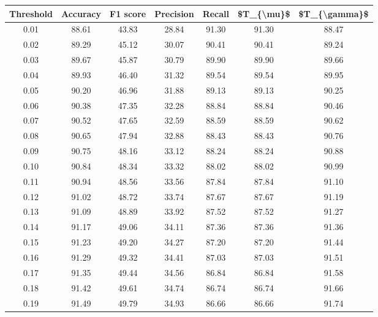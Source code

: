 \begin{tabular}{|c|c|c|c|c|c|c|}
\hline
 Threshold &  Accuracy &  F1 score &  Precision &  Recall &  \$T\_\{\textbackslash mu\}\$ &  \$T\_\{\textbackslash gamma\}\$ \\
\hline
      0.01 &     88.61 &     43.83 &      28.84 &   91.30 &      91.30 &         88.47 \\
      0.02 &     89.29 &     45.12 &      30.07 &   90.41 &      90.41 &         89.24 \\
      0.03 &     89.67 &     45.87 &      30.79 &   89.90 &      89.90 &         89.66 \\
      0.04 &     89.93 &     46.40 &      31.32 &   89.54 &      89.54 &         89.95 \\
      0.05 &     90.20 &     46.96 &      31.88 &   89.13 &      89.13 &         90.25 \\
      0.06 &     90.38 &     47.35 &      32.28 &   88.84 &      88.84 &         90.46 \\
      0.07 &     90.52 &     47.65 &      32.59 &   88.59 &      88.59 &         90.62 \\
      0.08 &     90.65 &     47.94 &      32.88 &   88.43 &      88.43 &         90.76 \\
      0.09 &     90.75 &     48.16 &      33.12 &   88.24 &      88.24 &         90.88 \\
      0.10 &     90.84 &     48.34 &      33.32 &   88.02 &      88.02 &         90.99 \\
      0.11 &     90.94 &     48.56 &      33.56 &   87.84 &      87.84 &         91.10 \\
      0.12 &     91.02 &     48.72 &      33.74 &   87.67 &      87.67 &         91.19 \\
      0.13 &     91.09 &     48.89 &      33.92 &   87.52 &      87.52 &         91.27 \\
      0.14 &     91.17 &     49.06 &      34.11 &   87.36 &      87.36 &         91.36 \\
      0.15 &     91.23 &     49.20 &      34.27 &   87.20 &      87.20 &         91.44 \\
      0.16 &     91.29 &     49.32 &      34.41 &   87.03 &      87.03 &         91.51 \\
      0.17 &     91.35 &     49.44 &      34.56 &   86.84 &      86.84 &         91.58 \\
      0.18 &     91.42 &     49.61 &      34.74 &   86.74 &      86.74 &         91.66 \\
      0.19 &     91.49 &     49.79 &      34.93 &   86.66 &      86.66 &         91.74 \\

\end{tabular}

